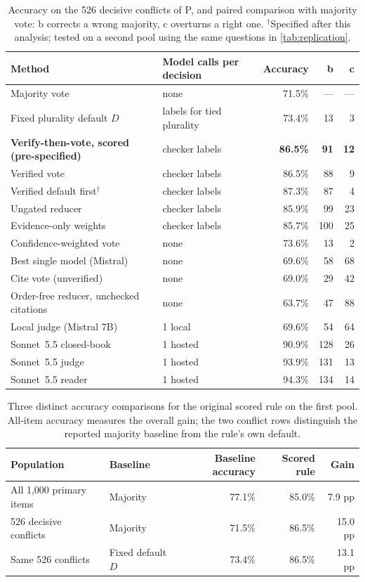 \begin{table}[t]
  \centering
  \caption{Accuracy on the 526 decisive conflicts of P, and paired comparison with majority vote: b corrects a wrong majority, c overturns a right one. $^\dagger$Specified after this analysis; tested on a second pool using the same questions in \cref{tab:replication}.}
  \label{tab:overturn}
  \small
  \begin{tabular}{@{}llrrr@{}}
    \toprule
    Method & Model calls per decision & Accuracy & b & c \\
    \midrule
    Majority vote & none & 71.5\% & --- & --- \\
    Fixed plurality default $D$ & labels for tied plurality & 73.4\% & 13 & 3 \\
    \textbf{Verify-then-vote, scored (pre-specified)} & checker labels & \textbf{86.5\%} & \textbf{91} & \textbf{12} \\
    Verified vote & checker labels & 86.5\% & 88 & 9 \\
    Verified default first$^\dagger$ & checker labels & 87.3\% & 87 & 4 \\
    Ungated reducer & checker labels & 85.9\% & 99 & 23 \\
    Evidence-only weights & checker labels & 85.7\% & 100 & 25 \\
    Confidence-weighted vote & none & 73.6\% & 13 & 2 \\
    Best single model (Mistral) & none & 69.6\% & 58 & 68 \\
    Cite vote (unverified) & none & 69.0\% & 29 & 42 \\
    Order-free reducer, unchecked citations & none & 63.7\% & 47 & 88 \\
    \midrule
    Local judge (Mistral 7B) & 1 local & 69.6\% & 54 & 64 \\
    Sonnet~5.5 closed-book & 1 hosted & 90.9\% & 128 & 26 \\
    Sonnet~5.5 judge & 1 hosted & 93.9\% & 131 & 13 \\
    Sonnet~5.5 reader & 1 hosted & 94.3\% & 134 & 14 \\
    \bottomrule
  \end{tabular}
\end{table}

\begin{table}[t]
  \centering
  \caption{Three distinct accuracy comparisons for the original scored rule on the first pool. All-item accuracy measures the overall gain; the two conflict rows distinguish the reported majority baseline from the rule's own default.}
  \label{tab:matched-default}
  \small
  \begin{tabular}{@{}llrrr@{}}
    \toprule
    Population & Baseline & Baseline accuracy & Scored rule & Gain \\
    \midrule
    All 1,000 primary items & Majority & 77.1\% & 85.0\% & 7.9 pp \\
    526 decisive conflicts & Majority & 71.5\% & 86.5\% & 15.0 pp \\
    Same 526 conflicts & Fixed default $D$ & 73.4\% & 86.5\% & 13.1 pp \\
    \bottomrule
  \end{tabular}
\end{table}

